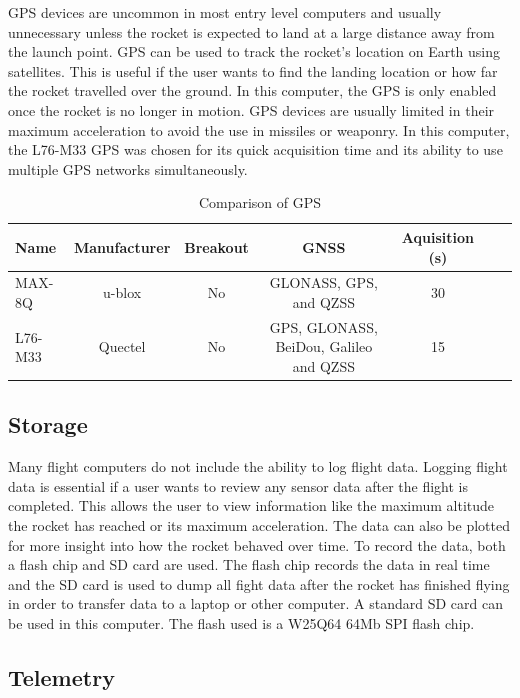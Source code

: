 \documentclass[conf]{new-aiaa}
\begin{document}
GPS devices are uncommon in most entry level computers and usually unnecessary unless the rocket is expected to land at a large distance away from the launch point. GPS can be used to track the rocket's location on Earth using satellites. This is useful if the user wants to find the landing location or how far the rocket travelled over the ground. In this computer, the GPS is only enabled once the rocket is no longer in motion. GPS devices are usually limited in their maximum acceleration\cite{l76} to avoid the use in missiles or weaponry.
In this computer, the L76-M33 GPS was chosen for its quick acquisition time and its ability to use multiple GPS networks simultaneously.

 \begin{table}[H]
 \caption{\label{tab:table2} Comparison of GPS}
 \centering
 \begin{tabular}{lcccccc}
 
 \hline Name & Manufacturer & Breakout & GNSS & Aquisition (s) \\ \hline

 MAX-8Q\cite{max8q} & u-blox & No & GLONASS, GPS, and QZSS & 30\\
 L76-M33\cite{l76} & Quectel & No & GPS, GLONASS, BeiDou, Galileo and QZSS & 15\\
 
 \hline
 \end{tabular}
 \end{table}

 \subsection{Storage}

 Many flight computers do not include the ability to log flight data. Logging flight data is essential if a user wants to review any sensor data after the flight is completed. This allows the user to view information like the maximum altitude the rocket has reached or its maximum acceleration. The data can also be plotted for more insight into how the rocket behaved over time. To record the data, both a flash chip and SD card are used. The flash chip records the data in real time and the SD card is used to dump all fight data after the rocket has finished flying in order to transfer data to a laptop or other computer. A standard SD card can be used in this computer. The flash used is a W25Q64 64Mb SPI flash chip\cite{w25q64}.

 \subsection{Telemetry}
\end{document}
